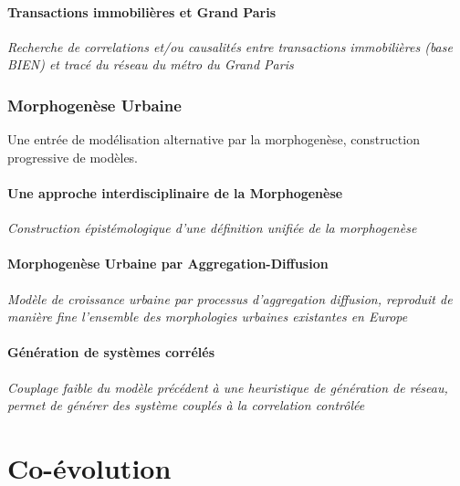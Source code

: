 \subsection{Transactions immobilières et Grand Paris}

\textit{Recherche de correlations et/ou causalités entre transactions immobilières (base BIEN) et tracé du réseau du métro du Grand Paris}



\section{Morphogenèse Urbaine}

{\color{blue}Une entrée de modélisation alternative par la morphogenèse, construction progressive de modèles.}

\subsection{Une approche interdisciplinaire de la Morphogenèse}

\textit{Construction épistémologique d'une définition unifiée de la morphogenèse}


\subsection{Morphogenèse Urbaine par Aggregation-Diffusion}

\textit{Modèle de croissance urbaine par processus d'aggregation diffusion, reproduit de manière fine l'ensemble des morphologies urbaines existantes en Europe}


\subsection{Génération de systèmes corrélés}

\textit{Couplage faible du modèle précédent à une heuristique de génération de réseau, permet de générer des système couplés à la correlation contrôlée}





\part{Co-évolution}


